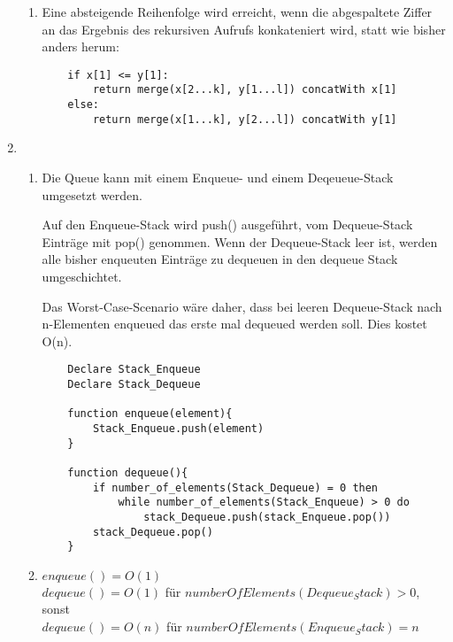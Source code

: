 \documentclass{article}
\begin{document}
\begin{enumerate}[\bfseries1.]
\begin{enumerate}
            \item 
                Eine absteigende Reihenfolge wird erreicht, wenn die abgespaltete
                Ziffer an das Ergebnis des rekursiven Aufrufs konkateniert wird,
                statt wie bisher anders herum:
                
\begin{lstlisting}
    if x[1] <= y[1]:
        return merge(x[2...k], y[1...l]) concatWith x[1]
    else:
        return merge(x[1...k], y[2...l]) concatWith y[1]
\end{lstlisting}

        \end{enumerate}
    
    \item
        \begin{enumerate}
            \item 
                Die Queue kann mit einem Enqueue- und einem Deqeueue-Stack
                umgesetzt werden.
                
                Auf den Enqueue-Stack wird push() ausgeführt, vom Dequeue-Stack
                Einträge mit pop() genommen. Wenn der Dequeue-Stack leer ist,
                werden alle bisher enqueuten Einträge zu dequeuen in den dequeue
                Stack umgeschichtet.
                
                Das Worst-Case-Scenario wäre daher, dass bei leeren
                Dequeue-Stack nach n-Elementen enqueued das erste mal dequeued
                werden soll. Dies kostet O(n).

\begin{lstlisting}
    Declare Stack_Enqueue
    Declare Stack_Dequeue

    function enqueue(element){
        Stack_Enqueue.push(element)
    }
    
    function dequeue(){
        if number_of_elements(Stack_Dequeue) = 0 then
            while number_of_elements(Stack_Enqueue) > 0 do
                stack_Dequeue.push(stack_Enqueue.pop())
        stack_Dequeue.pop()
    }
\end{lstlisting}
            
            \item
                $enqueue() = O(1)$
                \\ $dequeue() = O(1)$ für $numberOfElements(Dequeue_Stack) >
                0$, sonst
                \\ $dequeue() = O(n)$ für $numberOfElements(Enqueue_Stack) = n$


\end{enumerate}
\end{enumerate}
\end{document}
